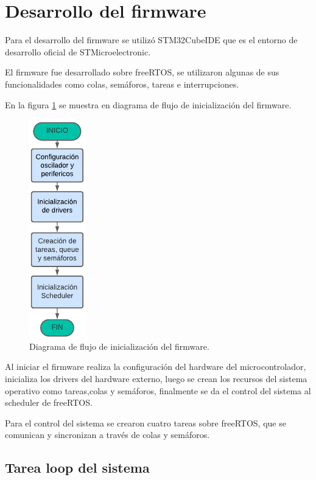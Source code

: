 \section{Desarrollo del firmware}

Para el desarrollo del firmware se utilizó STM32CubeIDE que es el entorno de desarrollo oficial de STMicroelectronic.

El firmware fue desarrollado sobre freeRTOS, se utilizaron algunas de sus funcionalidades como colas, semáforos, tareas e interrupciones.

En la figura \ref{fig:Df inicio firmware}  se muestra en diagrama de flujo de inicialización del firmware.

\begin{figure}[htbp]
  \centering
	\includegraphics[width=2.5cm, height=9.5cm]{./Figures/DF inicio firmware.png}
	\caption{Diagrama de flujo de inicialización del firmware.}
	\label{fig:Df inicio firmware}
\end{figure}

Al iniciar el  firmware realiza la configuración del hardware del microcontrolador, inicializa los drivers del hardware externo, luego se crean los recursos del sistema operativo como tareas,colas y semáforos, finalmente se da el control del sistema al scheduler de freeRTOS. 

Para el control del sistema se crearon cuatro tareas sobre freeRTOS, que se comunican y sincronizan a través de colas y semáforos.

\subsection{Tarea loop del sistema} 

